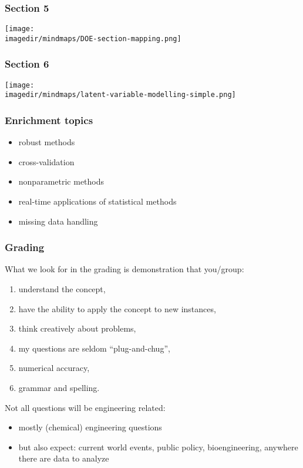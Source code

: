 \begin{frame}\frametitle{Section 5}
	
	\texttt{[image: \\imagedir/mindmaps/DOE-section-mapping.png]}
\end{frame}

\begin{frame}\frametitle{Section 6}
	
	\texttt{[image: \\imagedir/mindmaps/latent-variable-modelling-simple.png]}
\end{frame}

\begin{frame}\frametitle{Enrichment topics}
	\begin{itemize}
		\item	robust methods 
		\item	cross-validation 
		\item	nonparametric methods 
		\item	real-time applications of statistical methods 
		\item	missing data handling 
	\end{itemize}
\end{frame}

\begin{frame}\frametitle{Grading}	
	What we look for in the grading is demonstration that you/group: 
	\begin{enumerate}
		\item	understand the concept, 
		\item	have the ability to apply the concept to new instances, 
		\item	think creatively about problems, 
		\item	my questions are seldom ``plug-and-chug'',
		\item	numerical accuracy, 
		\item	grammar and spelling.
	\end{enumerate}
	
	\vspace{12pt}
	Not all questions will be engineering related: 
	\begin{itemize}
		\item	mostly (chemical) engineering questions 
		\item	but also expect: current world events, public policy, bioengineering, anywhere there are data to analyze 
	\end{itemize}
\end{frame}

